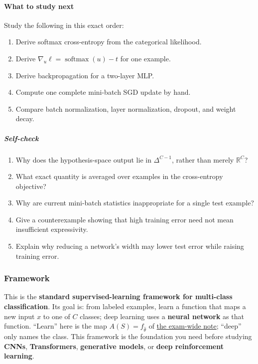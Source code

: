 \documentclass[11pt,a4paper]{article}
\DeclareMathOperator{\softmax}{softmax}
\newcommand{\jump}[2]{\hyperref[#1]{#2}}
\theoremstyle{definition}
\begin{document}
\paragraph{What to study next}

Study the following in this exact order:
\begin{enumerate}
    \item Derive softmax cross-entropy from the categorical likelihood.
    \item Derive $\nabla_u \ell = \softmax(u)-t$ for one example.
    \item Derive backpropagation for a two-layer MLP.
    \item Compute one complete mini-batch SGD update by hand.
    \item Compare batch normalization, layer normalization, dropout, and weight decay.
\end{enumerate}

\subparagraph{Self-check}
\begin{enumerate}
    \item Why does the hypothesis-space output lie in $\Delta^{C-1}$, rather than merely $\mathbb{R}^C$?
    \item What exact quantity is averaged over examples in the cross-entropy objective?
    \item Why are current mini-batch statistics inappropriate for a single test example?
    \item Give a counterexample showing that high training error need not mean insufficient expressivity.
    \item Explain why reducing a network's width may lower test error while raising training error.
\end{enumerate}

\subsubsection{Framework}

This is the \textbf{standard supervised-learning framework for multi-class classification}. Its goal is: from labeled examples, learn a function that maps a new input $x$ to one of $C$ classes; deep learning uses a \textbf{neural network} as that function. ``Learn'' here is the map \(A(S)=f_{\widehat\theta}\) of \jump{def:spr2025-learn}{the exam-wide note}; ``deep'' only names the class. This framework is the foundation you need before studying \textbf{CNNs}, \textbf{Transformers}, \textbf{generative models}, or \textbf{deep reinforcement learning}. 
\end{document}
